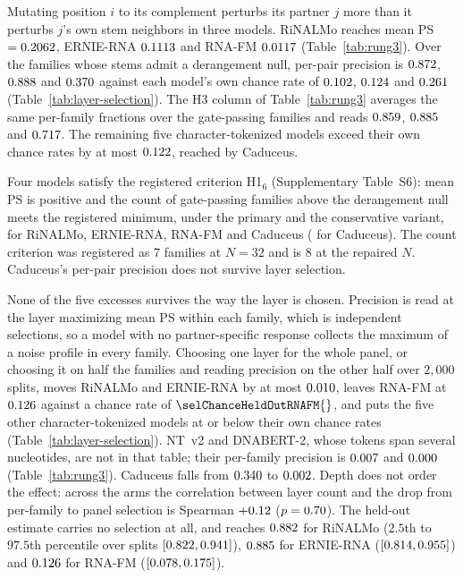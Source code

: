 \documentclass[11pt]{article}
\begin{document}






Mutating position $i$ to its complement perturbs its partner $j$ more than it
perturbs $j$'s own stem neighbors in three models. RiNALMo reaches mean
PS $= 0.2062{}$, ERNIE-RNA $0.1113{}$ and RNA-FM $0.0117{}$
(Table~\ref{tab:rung3}). Over the \chanceRateN{} families whose stems admit a
derangement null, per-pair precision is $0.872{}$,
$0.888{}$ and $0.370{}$ against each model's own
chance rate of $0.102{}$, $0.124{}$ and
$0.261{}$ (Table~\ref{tab:layer-selection}). The H3 column of
Table~\ref{tab:rung3} averages the same per-family fractions over the
gate-passing families and reads $0.859{}$, $0.885{}$ and
$0.717{}$. The remaining five character-tokenized models exceed their own
chance rates by at most $0.122{}$, reached by Caduceus.

Four models satisfy the registered criterion H1$_6$
(Supplementary Table~S6): mean PS is positive and the count of gate-passing
families above the derangement null meets the registered minimum, under the
primary and the conservative variant, for RiNALMo, ERNIE-RNA, RNA-FM and
Caduceus (\nullCaduceus{} for Caduceus). The count criterion was registered as
7 families at $N = 32$ and is 8 at the repaired $N$. Caduceus's per-pair
precision does not survive layer selection.

None of the five excesses survives the way the layer is chosen. Precision is
read at the layer maximizing mean PS within each family, which is
\chanceRateN{} independent selections, so a model with no partner-specific
response collects the maximum of a noise profile in every family. Choosing one
layer for the whole panel, or choosing it on half the families and reading
precision on the other half over $2{,}000$ splits, moves RiNALMo and ERNIE-RNA
by at most $0.010{}$, leaves RNA-FM at $0.126{}$
against a chance rate of $\selChanceHeldOutRNAFM{}$, and puts the five other
character-tokenized models at or below their own chance rates
(Table~\ref{tab:layer-selection}). NT~v2 and DNABERT-2, whose
tokens span several nucleotides, are not in that table; their per-family
precision is $0.007{}$ and $0.000{}$
(Table~\ref{tab:rung3}). Caduceus falls from
$0.340{}$ to $0.002{}$. Depth does not order the effect: across the \selectionArms{} arms the
correlation between layer count and the drop from per-family to panel selection
is Spearman $+0.12{}$ ($p = 0.70{}$). The held-out
estimate carries no selection at all, and reaches $0.882{}$ for
RiNALMo ($2.5$th to $97.5$th percentile over splits $[0.822, 0.941]{}$),
$0.885{}$ for ERNIE-RNA ($[0.814, 0.955]{}$) and
$0.126{}$ for RNA-FM ($[0.078, 0.175]{}$).
\end{document}
